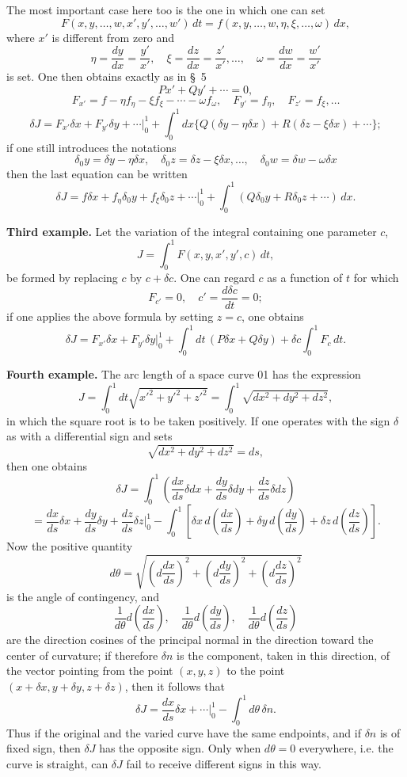 \documentclass[11pt,a4paper,leqno]{article}
\begin{document}
The most important case here too is the one in which one can set
\[
F(x,y,\ldots,w,x',y',\ldots,w')\,dt=f(x,y,\ldots,w,\eta,\xi,\ldots,\omega)\,dx,
\]
where \(x'\) is different from zero and
\[
\eta=\frac{dy}{dx}=\frac{y'}{x'},\quad \xi=\frac{dz}{dx}=\frac{z'}{x'},\ldots,\quad \omega=\frac{dw}{dx}=\frac{w'}{x'}
\]
is set. One then obtains exactly as in \S~5
\[
Px'+Qy'+\cdots=0,
\]
\[
F_{x'}=f-\eta f_\eta-\xi f_\xi-\cdots-\omega f_\omega,
\quad F_{y'}=f_\eta,\quad F_{z'}=f_\xi,\ldots
\]
\[
\delta J=F_{x'}\delta x+F_{y'}\delta y+\cdots\bigg|_0^1+\int_0^1dx\{Q(\delta y-\eta\delta x)+R(\delta z-\xi\delta x)+\cdots\};
\]
if one still introduces the notations
\[
\delta_0y=\delta y-\eta\delta x,\quad \delta_0z=\delta z-\xi\delta x,\ldots,\quad \delta_0w=\delta w-\omega\delta x
\]
then the last equation can be written
\[
\delta J=f\delta x+f_\eta\delta_0y+f_\xi\delta_0z+\cdots\bigg|_0^1
+\int_0^1(Q\delta_0y+R\delta_0z+\cdots)\,dx.
\]

\medskip
\noindent\textbf{Third example.} Let the variation of the integral containing one parameter \(c\),
\[
J=\int_0^1F(x,y,x',y',c)\,dt,
\]
be formed by replacing \(c\) by \(c+\delta c\). One can regard \(c\) as a function of \(t\) for which
\[
F_{c'}=0,\quad c'=\frac{d\delta c}{dt}=0;
\]
if one applies the above formula by setting \(z=c\), one obtains
\[
\delta J=F_{x'}\delta x+F_{y'}\delta y\bigg|_0^1+\int_0^1dt\,(P\delta x+Q\delta y)+\delta c\int_0^1F_c\,dt.
\]

\medskip
\noindent\textbf{Fourth example.} The arc length of a space curve 01 has the expression
\[
J=\int_0^1dt\sqrt{x'^2+y'^2+z'^2}=\int_0^1\sqrt{dx^2+dy^2+dz^2},
\]
in which the square root is to be taken positively. If one operates with the sign \(\delta\) as with a differential sign and sets
\[
\sqrt{dx^2+dy^2+dz^2}=ds,
\]
then one obtains
\[
\delta J=\int_0^1\left(\frac{dx}{ds}\delta dx+\frac{dy}{ds}\delta dy+\frac{dz}{ds}\delta dz\right)
\]
\[
=\frac{dx}{ds}\delta x+\frac{dy}{ds}\delta y+\frac{dz}{ds}\delta z\bigg|_0^1
-\int_0^1\left[\delta x\,d\left(\frac{dx}{ds}\right)+\delta y\,d\left(\frac{dy}{ds}\right)+\delta z\,d\left(\frac{dz}{ds}\right)\right].
\]
Now the positive quantity
\[
d\theta=\sqrt{\left(d\frac{dx}{ds}\right)^2+\left(d\frac{dy}{ds}\right)^2+\left(d\frac{dz}{ds}\right)^2}
\]
is the angle of contingency, and
\[
\frac{1}{d\theta}d\left(\frac{dx}{ds}\right),\quad
\frac{1}{d\theta}d\left(\frac{dy}{ds}\right),\quad
\frac{1}{d\theta}d\left(\frac{dz}{ds}\right)
\]
are the direction cosines of the principal normal in the direction toward the center of curvature; if therefore \(\delta n\) is the component, taken in this direction, of the vector pointing from the point \((x,y,z)\) to the point \((x+\delta x,y+\delta y,z+\delta z)\), then it follows that
\[
\delta J=\frac{dx}{ds}\delta x+\cdots\bigg|_0^1-\int_0^1d\theta\,\delta n.
\]
Thus if the original and the varied curve have the same endpoints, and if \(\delta n\) is of fixed sign, then \(\delta J\) has the opposite sign. Only when \(d\theta=0\) everywhere, i.e. the curve is straight, can \(\delta J\) fail to receive different signs in this way.
\end{document}
